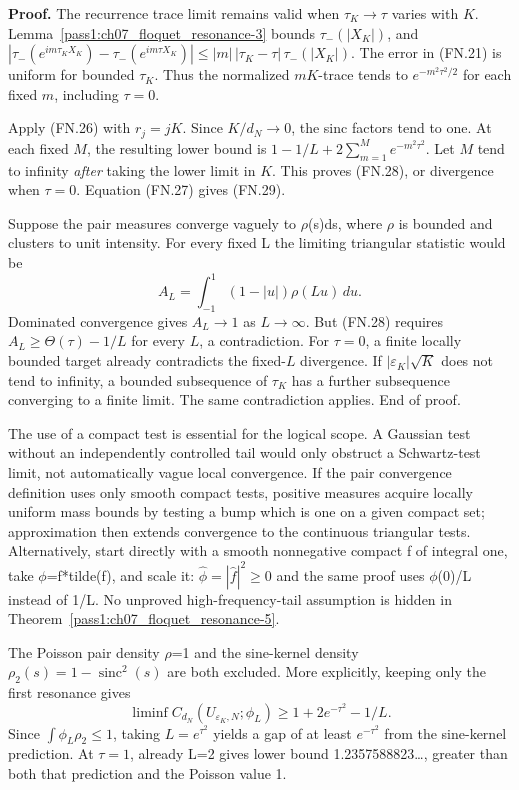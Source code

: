 \textbf{Proof.} The recurrence trace limit remains valid when \(\tau_K\to\tau\) varies with \(K\). Lemma~\ref{pass1:ch07_floquet_resonance-3} bounds \(\tau_-(|X_K|)\), and \(|\tau_-(e^{im\tau_KX_K})-\tau_-(e^{im\tau X_K})|\leq |m|\,|\tau_K-\tau|\,\tau_-(|X_K|)\). The error in (FN.21) is uniform for bounded \(\tau_K\). Thus the normalized \(mK\)-trace tends to \(e^{-m^2\tau^2/2}\) for each fixed \(m\), including \(\tau=0\).

Apply (FN.26) with \(r_j=jK\). Since \(K/d_N\to0\), the sinc factors tend to one. At each fixed \(M\), the resulting lower bound is \(1-1/L+2\sum_{m=1}^M e^{-m^2\tau^2}\). Let \(M\) tend to infinity \emph{after} taking the lower limit in \(K\). This proves (FN.28), or divergence when \(\tau=0\). Equation (FN.27) gives (FN.29).

Suppose the pair measures converge vaguely to \(\rho\)(s)ds, where \(\rho\) is bounded and clusters to unit intensity. For every fixed L the limiting triangular statistic would be \[
 A_L=\int_{-1}^1(1-|u|)\rho(Lu)\,du.
\] Dominated convergence gives \(A_L\to1\) as \(L\to\infty\). But (FN.28) requires \(A_L\geq\Theta(\tau)-1/L\) for every \(L\), a contradiction. For \(\tau=0\), a finite locally bounded target already contradicts the fixed-\(L\) divergence. If \(|\varepsilon_K|\sqrt K\) does not tend to infinity, a bounded subsequence of \(\tau_K\) has a further subsequence converging to a finite limit. The same contradiction applies. End of proof.

The use of a compact test is essential for the logical scope. A Gaussian test without an independently controlled tail would only obstruct a Schwartz-test limit, not automatically vague local convergence. If the pair convergence definition uses only smooth compact tests, positive measures acquire locally uniform mass bounds by testing a bump which is one on a given compact set; approximation then extends convergence to the continuous triangular tests. Alternatively, start directly with a smooth nonnegative compact f of integral one, take \(\phi\)=f*tilde(f), and scale it: \(\widehat\phi=|\widehat f|^2\geq0\) and the same proof uses \(\phi\)(0)/L instead of 1/L. No unproved high-frequency-tail assumption is hidden in Theorem~\ref{pass1:ch07_floquet_resonance-5}.

The Poisson pair density \(\rho\)=1 and the sine-kernel density \(\rho_2(s)=1-\operatorname{sinc}^2(s)\) are both excluded. More explicitly, keeping only the first resonance gives \[
 \liminf C_{d_N}(U_{\varepsilon_K,N};\phi_L)
        \geq1+2e^{-\tau^2}-1/L.                               \tag{FN.31}
\] Since \(\int\phi_L\rho_2\leq1\), taking \(L=e^{\tau^2}\) yields a gap of at least \(e^{-\tau^2}\) from the sine-kernel prediction. At \(\tau=1\), already L=2 gives lower bound 1.2357588823\ldots, greater than both that prediction and the Poisson value 1.

